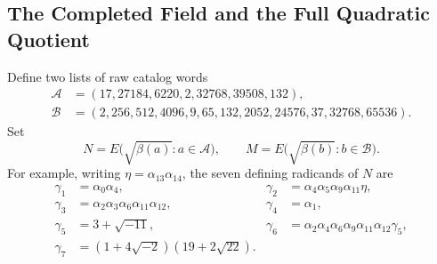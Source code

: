 \subsection{The Completed Field and the Full Quadratic Quotient}
Define two lists of raw catalog words
\begin{align}
 \mathcal A&=(17,27184,6220,2,32768,39508,132),
       \label{ar:completed-words}\\
 \mathcal B&=(2,256,512,4096,9,65,132,2052,24576,37,32768,65536).
       \label{ar:full-words}
\end{align}
Set
\[
 N=E\bigl(\sqrt{\beta(a)}:a\in\mathcal A\bigr),\qquad
 M=E\bigl(\sqrt{\beta(b)}:b\in\mathcal B\bigr).
\]
For example, writing $\eta=\alpha_{13}\alpha_{14}$, the seven defining
radicands of $N$ are
\begin{align*}
 \gamma_1&=\alpha_0\alpha_4,&
 \gamma_2&=\alpha_4\alpha_5\alpha_9\alpha_{11}\eta,\\
 \gamma_3&=\alpha_2\alpha_3\alpha_6\alpha_{11}\alpha_{12},&
 \gamma_4&=\alpha_1,\\
 \gamma_5&=3+\sqrt{-11},&
 \gamma_6&=\alpha_2\alpha_4\alpha_6\alpha_9\alpha_{11}\alpha_{12}\gamma_5,\\
 \gamma_7&=(1+4\sqrt{-2})(19+2\sqrt{22}).
\end{align*}

